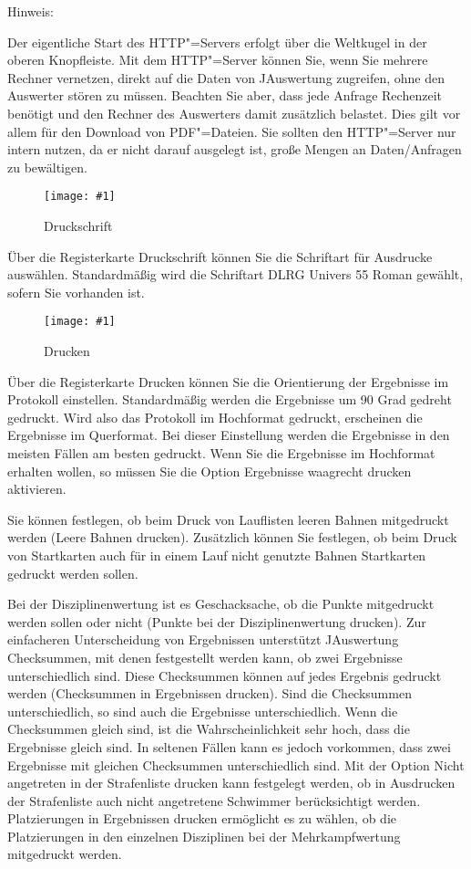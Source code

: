 \documentclass[11pt,a4paper,twoside,ngerman]{article}
\newcommand{\hsmimage}[3]{\begin{figure}[!ht]\centering\texttt{[image: \#1]}\caption{#3}\end{figure}}
\begin{document}
\begin{bfseries}Hinweis:\end{bfseries} Der eigentliche Start des HTTP"=Servers erfolgt über die Weltkugel in der oberen Knopfleiste. Mit dem HTTP"=Server können Sie, wenn Sie mehrere Rechner vernetzen, direkt auf die Daten von JAuswertung zugreifen, ohne den Auswerter stören zu müssen. Beachten Sie aber, dass jede Anfrage Rechenzeit benötigt und den Rechner des Auswerters damit zusätzlich belastet. Dies gilt vor allem für den Download von PDF"=Dateien. Sie sollten den HTTP"=Server nur intern nutzen, da er nicht darauf ausgelegt ist, große Mengen an Daten/Anfragen zu bewältigen. 


\hsmimage{pics/optionen-druckschrift}{.66\textwidth}{Druckschrift}
Über die Registerkarte \glqq{}Druckschrift\grqq{} können Sie die Schriftart für Ausdrucke auswählen. Standardmäßig wird die Schriftart \glqq{}DLRG Univers 55 Roman\grqq{} gewählt, sofern Sie vorhanden ist.


\hsmimage{pics/optionen-drucken}{.66\textwidth}{Drucken}
Über die Registerkarte \glqq{}Drucken\grqq{} können Sie die Orientierung der Ergebnisse im Protokoll einstellen. Standardmäßig werden die Ergebnisse um 90 Grad gedreht gedruckt. Wird also das Protokoll im Hochformat gedruckt, erscheinen die Ergebnisse im Querformat. Bei dieser Einstellung werden die Ergebnisse in den meisten Fällen am besten gedruckt. Wenn Sie die Ergebnisse im Hochformat erhalten wollen, so müssen Sie die Option \glqq{}Ergebnisse waagrecht drucken\grqq{} aktivieren. 

Sie können festlegen, ob beim Druck von Lauflisten leeren Bahnen mitgedruckt werden (\glqq{}Leere Bahnen drucken\grqq{}). Zusätzlich können Sie festlegen, ob beim Druck von Startkarten auch für in einem Lauf nicht genutzte Bahnen Startkarten gedruckt werden sollen. 

Bei der Disziplinenwertung ist es Geschacksache, ob die Punkte mitgedruckt werden sollen oder nicht (\glqq{}Punkte bei der Disziplinenwertung drucken\grqq{}). Zur einfacheren Unterscheidung von Ergebnissen unterstützt JAuswertung Checksummen, mit denen festgestellt werden kann, ob zwei Ergebnisse unterschiedlich sind. Diese Checksummen können auf jedes Ergebnis gedruckt werden (\glqq{}Checksummen in Ergebnissen drucken\grqq{}). Sind die Checksummen unterschiedlich, so sind auch die Ergebnisse unterschiedlich. Wenn die Checksummen gleich sind, ist die Wahrscheinlichkeit sehr hoch, dass die Ergebnisse gleich sind. In seltenen Fällen kann es jedoch vorkommen, dass zwei Ergebnisse mit gleichen Checksummen unterschiedlich sind. Mit der Option \glqq{}Nicht angetreten in der Strafenliste drucken\grqq{} kann festgelegt werden, ob in Ausdrucken der Strafenliste auch \glqq{}nicht angetretene\grqq{} Schwimmer berücksichtigt werden. \glqq{}Platzierungen in Ergebnissen drucken\grqq{} ermöglicht es zu wählen, ob die Platzierungen in den einzelnen Disziplinen bei der Mehrkampfwertung mitgedruckt werden. 
\end{document}

